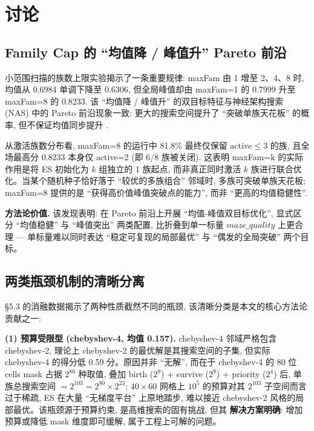 
\section{讨论}
\label{sec:discussion}

\subsection{Family Cap 的 ``均值降 / 峰值升'' Pareto 前沿}

小范围扫描的族数上限实验揭示了一条重要规律: maxFam 由 1 增至 2、4、8 时, 均值从 0.6984 单调下降至 0.6306, 但全局峰值却由 maxFam=1 的 0.7999 升至 maxFam=8 的 0.8233. 该 ``均值降 / 峰值升'' 的双目标特征与神经架构搜索 (NAS) 中的 Pareto 前沿现象一致: 更大的搜索空间提升了 ``突破单族天花板'' 的概率, 但不保证均值同步提升 \cite{liu2018darts, real2019regularized}.

从激活族数分布看, maxFam=8 的运行中 81.8\% 最终仅保留 $\text{active} \le 3$ 的族, 且全场最高分 0.8233 本身仅 active=2 (即 6/8 族被关闭). 这表明 maxFam=k 的实际作用是将 ES 初始化为 $k$ 组独立的 1 族起点, 而非真正同时激活 $k$ 族进行联合优化。当某个随机种子恰好落于 ``较优的多族组合'' 邻域时, 多族可突破单族天花板; maxFam=8 提供的是 ``获得高价值峰值突破点的能力'', 而非 ``更高的均值稳健性''.

\medskip\noindent\textbf{方法论价值.} 该发现表明: 在 Pareto 前沿上开展 ``均值-峰值双目标优化'', 显式区分 ``均值稳健'' 与 ``峰值突出'' 两类配置, 比折叠到单一标量 $maze\_quality$ 上更合理 --- 单标量难以同时表达 ``稳定可复现的局部最优'' 与 ``偶发的全局突破'' 两个目标。

\subsection{两类瓶颈机制的清晰分离}

§5.3 的消融数据揭示了两种性质截然不同的瓶颈, 该清晰分类是本文的核心方法论贡献之一:

\noindent\textbf{(1) 预算受限型 (chebyshev-4, 均值 0.157).}
chebyshev-4 邻域严格包含 chebyshev-2, 理论上 chebyshev-2 的最优解是其搜索空间的子集, 但实际 chebyshev-4 的得分低 0.59 分。原因并非 ``无解'', 而在于 chebyshev-4 的 80 位 cells mask 占据 $2^{80}$ 种取值, 叠加 birth ($2^9$) + survive ($2^9$) + priority ($2^4$) 后, 单族总搜索空间 $= 2^{103} = 2^{80} \times 2^{23}$; $40 \times 60$ 网格上 $10^5$ 的预算对其 $2^{103}$ 子空间而言过于稀疏, ES 在大量 ``无梯度平台'' 上原地踏步, 难以接近 chebyshev-2 风格的局部最优。该瓶颈源于预算约束, 是高维搜索的固有挑战, 但其 \textbf{解决方案明确}: 增加预算或降低 mask 维度即可缓解, 属于工程上可解的问题。

